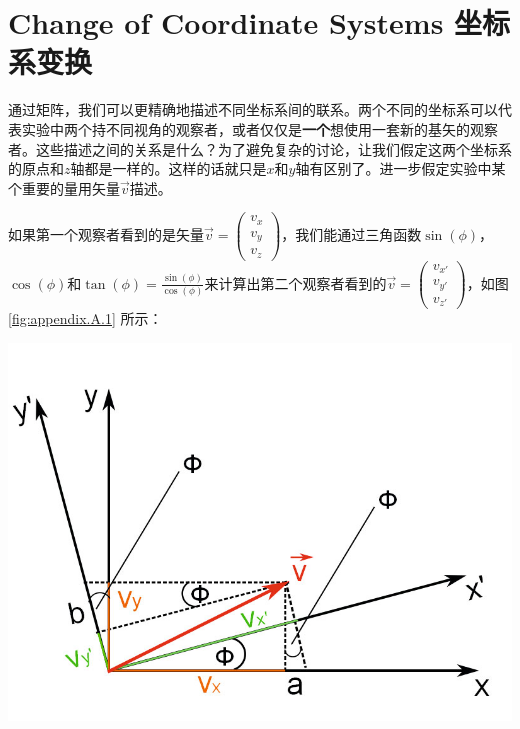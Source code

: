 \section[坐标系变换]{Change of Coordinate Systems 坐标系变换}\label{appendix.A.2}
通过矩阵，我们可以更精确地描述不同坐标系间的联系。两个不同的坐标系可以代表实验中两个持不同视角的观察者，或者仅仅是{\bf 一个}想使用一套新的基矢的观察者。这些描述之间的关系是什么？为了避免复杂的讨论，让我们假定这两个坐标系的原点和$z$轴都是一样的。这样的话就只是$x$和$y$轴有区别了。进一步假定实验中某个重要的量用矢量$\vec{v}$描述。

如果第一个观察者看到的是矢量$\vec{v}= \begin{pmatrix}
v_x \\ v_y \\ v_z
\end{pmatrix}$，我们能通过三角函数$\sin(\phi)$，$\cos(\phi)$和$\tan(\phi)=\frac{\sin(\phi)}{\cos(\phi)}$来计算出第二个观察者看到的$\vec{v}= \begin{pmatrix}
v_{x'} \\ v_{y'} \\ v_{z'}
\end{pmatrix}$，如图\ref{fig:appendix.A.1} 所示：

\includegraphics[width=\textwidth]{Figure/fig_appendix_A_3.png}

